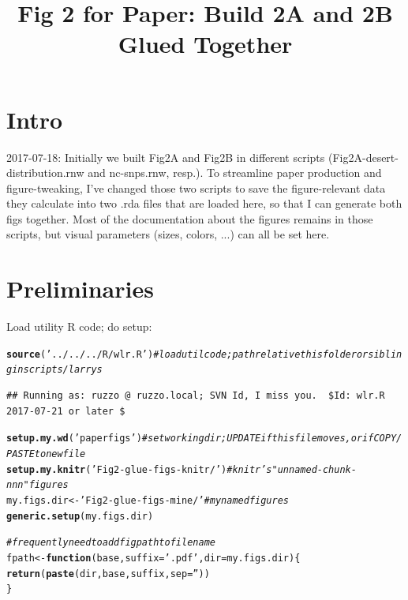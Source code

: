 \documentclass{article}\usepackage[]{graphicx}\usepackage[]{color}
\makeatletter
\newcommand{\hlstr}[1]{\textcolor[rgb]{0.192,0.494,0.8}{#1}}%
\newcommand{\hlcom}[1]{\textcolor[rgb]{0.678,0.584,0.686}{\textit{#1}}}%
\newcommand{\hlstd}[1]{\textcolor[rgb]{0.345,0.345,0.345}{#1}}%
\newcommand{\hlkwa}[1]{\textcolor[rgb]{0.161,0.373,0.58}{\textbf{#1}}}%
\newcommand{\hlkwb}[1]{\textcolor[rgb]{0.69,0.353,0.396}{#1}}%
\newcommand{\hlkwc}[1]{\textcolor[rgb]{0.333,0.667,0.333}{#1}}%
\newcommand{\hlkwd}[1]{\textcolor[rgb]{0.737,0.353,0.396}{\textbf{#1}}}%
\newenvironment{kframe}{%
 \def\at@end@of@kframe{}%
 \ifinner\ifhmode%
  \def\at@end@of@kframe{\end{minipage}}%
  \begin{minipage}{\columnwidth}%
 \fi\fi%
 \def\FrameCommand##1{\hskip\@totalleftmargin \hskip-\fboxsep
 \colorbox{shadecolor}{##1}\hskip-\fboxsep
     \hskip-\linewidth \hskip-\@totalleftmargin \hskip\columnwidth}%
 \MakeFramed {\advance\hsize-\width
   \@totalleftmargin\z@ \linewidth\hsize
   \@setminipage}}%
 {\par\unskip\endMakeFramed%
 \at@end@of@kframe}
\newenvironment{knitrout}{}{} %
\makeatother
\begin{document}
\title{Fig 2 for Paper: Build 2A and 2B Glued Together}
\maketitle

\tableofcontents

\section{Intro}
2017-07-18: 
Initially we built Fig2A and Fig2B in different scripts (Fig2A-desert-distribution.rnw and nc-snps.rnw, resp.).  To streamline paper production and figure-tweaking, I've changed those two scripts to save the figure-relevant data they calculate into two .rda files that are loaded here, so that I can generate both figs together.  Most of the documentation about the figures remains in those scripts, but visual parameters (sizes, colors, ...) can all be set here.

\section{Preliminaries}
Load utility R code; do setup:

\begin{knitrout}\footnotesize
{}\color{fgcolor}\begin{kframe}
\begin{alltt}
\hlkwd{source}\hlstd{(}\hlstr{'../../../R/wlr.R'}\hlstd{)} \hlcom{# load util code; path relative this folder or sibling in scripts/larrys }
\end{alltt}
\begin{verbatim}
## Running as: ruzzo @ ruzzo.local; SVN Id, I miss you.  $Id: wlr.R  2017-07-21 or later $
\end{verbatim}
\begin{alltt}
\hlkwd{setup.my.wd}\hlstd{(}\hlstr{'paperfigs'}\hlstd{)} \hlcom{# set working dir; UPDATE if this file moves, or if COPY/PASTE to new file}
\hlkwd{setup.my.knitr}\hlstd{(}\hlstr{'Fig2-glue-figs-knitr/'}\hlstd{)} \hlcom{# knitr's "unnamed-chunk-nnn" figures}
\hlstd{my.figs.dir} \hlkwb{<-} \hlstr{'Fig2-glue-figs-mine/'}   \hlcom{# my named figures}
\hlkwd{generic.setup}\hlstd{(my.figs.dir)}
\end{alltt}
\end{kframe}
\end{knitrout}
\begin{knitrout}\footnotesize
{}\color{fgcolor}\begin{kframe}
\begin{alltt}
\hlcom{# frequently need to add figpath to file name}
\hlstd{fpath} \hlkwb{<-} \hlkwa{function}\hlstd{(}\hlkwc{base}\hlstd{,} \hlkwc{suffix}\hlstd{=}\hlstr{'.pdf'}\hlstd{,} \hlkwc{dir}\hlstd{=my.figs.dir)\{}
  \hlkwd{return}\hlstd{(}\hlkwd{paste}\hlstd{(dir, base, suffix,} \hlkwc{sep}\hlstd{=}\hlstr{''}\hlstd{))}
\hlstd{\}}
\end{alltt}
\end{kframe}
\end{knitrout}
\end{document}
